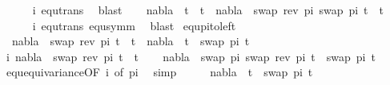 \begin{isabellebody}
\ \ \ \ \isamarkupfalse%
\ i\ equ{\isacharunderscore}{\kern0pt}trans\ \isamarkupfalse%
\ blast\isanewline
\ \ \isamarkupfalse%
\ {\isachardoublequoteopen}nabla\ {\isasymturnstile}\ t{}\ {\isasymapprox}\ t{}\ {\isasymLongrightarrow}\ nabla\ {\isasymturnstile}\ swap\ {\isacharparenleft}{\kern0pt}rev\ pi{\isacharparenright}{\kern0pt}\ {\isacharparenleft}{\kern0pt}swap\ pi\ t{}{\isacharparenright}{\kern0pt}\ {\isasymapprox}\ t{}{\isachardoublequoteclose}\isanewline
\ \ \ \ \isamarkupfalse%
\ i\ equ{\isacharunderscore}{\kern0pt}trans\ equ{\isacharunderscore}{\kern0pt}symm\ \isamarkupfalse%
\ blast\isanewline
{}\isamarkupfalse%
%
\endisatagproof
{\isafoldproof}%
%
\isadelimproof
\isanewline
%
\endisadelimproof
\isanewline
\isanewline
{}\isamarkupfalse%
\ equ{\isacharunderscore}{\kern0pt}pi{\isacharunderscore}{\kern0pt}to{\isacharunderscore}{\kern0pt}left{\isacharcolon}{\kern0pt}\ \isanewline
\ \ {\isachardoublequoteopen}nabla\ {\isasymturnstile}\ swap\ {\isacharparenleft}{\kern0pt}rev\ pi{\isacharparenright}{\kern0pt}\ t{}\ {\isasymapprox}\ t{}\ {\isacharequal}{\kern0pt}\ nabla\ {\isasymturnstile}\ t{}\ {\isasymapprox}\ swap\ pi\ t{}{\isachardoublequoteclose}\isanewline
%
\isadelimproof
%
\endisadelimproof
%
\isatagproof
{}\isamarkupfalse%
\isanewline
\isanewline
\ \ \isacommand{{\isacharbraceleft}{\kern0pt}}\isamarkupfalse%
\isamarkupfalse%
\ i{\isacharcolon}{\kern0pt}\ {\isachardoublequoteopen}nabla\ {\isasymturnstile}\ swap\ {\isacharparenleft}{\kern0pt}rev\ pi{\isacharparenright}{\kern0pt}\ t{}\ {\isasymapprox}\ t{}{\isachardoublequoteclose}\isanewline
\ \ \isamarkupfalse%
\ {\isachardoublequoteopen}nabla\ {\isasymturnstile}\ swap\ pi\ {\isacharparenleft}{\kern0pt}swap\ {\isacharparenleft}{\kern0pt}rev\ pi{\isacharparenright}{\kern0pt}\ t{}{\isacharparenright}{\kern0pt}\ {\isasymapprox}\ swap\ pi\ t{}{\isachardoublequoteclose}\isanewline
\ \ \ \ \isamarkupfalse%
\ equ{\isacharunderscore}{\kern0pt}equivariance{\isacharbrackleft}{\kern0pt}OF\ i{\isacharcomma}{\kern0pt}\ of\ pi{\isacharbrackright}{\kern0pt}\ \isamarkupfalse%
\ simp\isanewline
\ \ \isamarkupfalse%
\ \isamarkupfalse%
\ {\isachardoublequoteopen}nabla\ {\isasymturnstile}\ t{}\ {\isasymapprox}\ swap\ pi\ t{}{\isachardoublequoteclose}\isanewline

\end{isabellebody}
